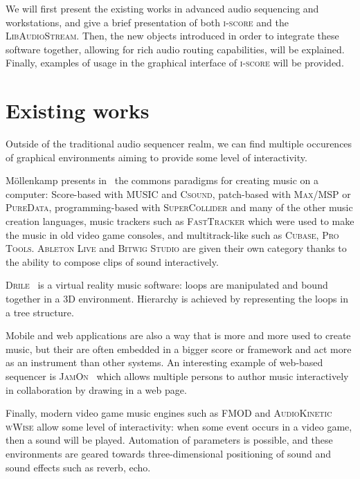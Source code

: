 \documentclass{article}
\newcommand*{\LibAudioStream}{\textsc{LibAudioStream}\xspace}
\newcommand*{\iscore}{\textsc{i-score}\xspace}
\newcommand*{\maxmsp}{\textsc{Max/MSP}\xspace}
\newcommand*{\puredata}{\textsc{PureData}\xspace}
\newcommand*{\csound}{\textsc{Csound}\xspace}
\newcommand*{\supercollider}{\textsc{SuperCollider}\xspace}
\newcommand*{\abletonlive}{\textsc{Ableton Live}\xspace}
\newcommand*{\bitwigstudio}{\textsc{Bitwig Studio}\xspace}
\newcommand*{\fasttracker}{\textsc{FastTracker}\xspace}
\newcommand*{\cubase}{\textsc{Cubase}\xspace}
\newcommand*{\protools}{\textsc{Pro Tools}\xspace}
\newcommand*{\MUSIC}{\textsc{MUSIC}\xspace}
\newcommand*{\drile}{\textsc{Drile}\xspace}
\newcommand*{\jamon}{\textsc{JamOn}\xspace}
\newcommand*{\wwise}{\textsc{AudioKinetic wWise}\xspace}
\newcommand*{\fmod}{\textsc{FMOD}\xspace}
\begin{document}
We will first present the existing works in advanced audio sequencing and workstations, 
and give a brief presentation of both \iscore and the \LibAudioStream.
Then, the new objects introduced in order to integrate these software together, allowing 
for rich audio routing capabilities, will be explained.
Finally, examples of usage in the graphical interface of \iscore will be provided.



\section{Existing works}
Outside of the traditional audio sequencer realm, we can find 
multiple occurences of graphical environments aiming to provide 
some level of interactivity.

M{\"o}llenkamp presents in~\cite{mollenkampparadigms} the 
commons paradigms for creating music on a computer: Score-based with \MUSIC and \csound, 
patch-based with \maxmsp or \puredata, programming-based with \supercollider and many of the other music creation languages, music trackers such as \fasttracker which were used to make the music in old video game consoles, and multitrack-like such as \cubase, \protools.
\abletonlive and \bitwigstudio are given their own category thanks to the ability to compose clips of sound interactively.

\drile~\cite{berthaut2010drile} is a virtual reality music software: loops are manipulated and bound together in a 3D environment. Hierarchy is achieved by representing the loops in a tree structure.

Mobile and web applications are also a way that is more and more used to create music, 
but their are often embedded in a bigger score or framework and act more as an instrument than other systems.
An interesting example of web-based sequencer is \jamon~\cite{rosselet2013jam} which allows multiple persons to author music interactively in collaboration by drawing in a web page.

Finally, modern video game music engines such as \fmod and \wwise allow some level of interactivity: when some event occurs in a video game, then a sound will be played. 
Automation of parameters is possible, and these environments are geared towards three-dimensional positioning of sound and sound effects such as reverb, echo.
\end{document}
